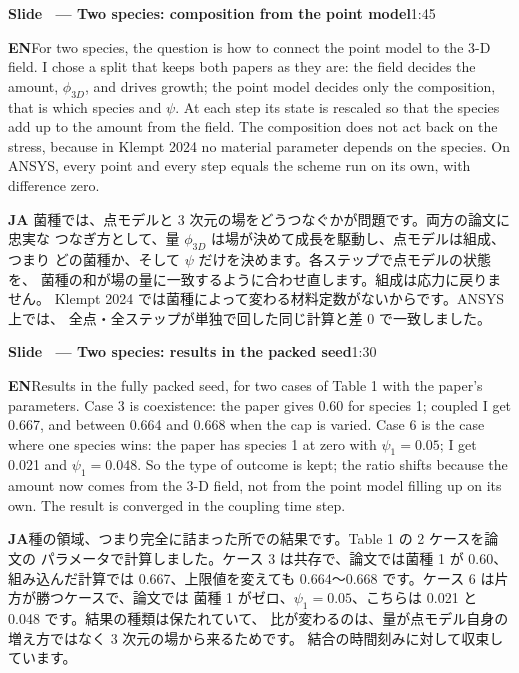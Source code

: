 \documentclass[11pt,a4paper]{article}
\newcounter{sl}
\newcommand{\slide}[2]{\stepcounter{sl}\vspace{8pt}%
  {\color{c3}\large\bfseries Slide \thesl\ --- #1}\hfill{\small #2}\par\vspace{2pt}}
\newcommand{\EN}{\textbf{EN}\quad}
\newcommand{\JA}{\par\textbf{JA}\quad}
\begin{document}
\slide{Two species: composition from the point model}{1:45}
\EN For two species, the question is how to connect the point model to the 3-D
field. I chose a split that keeps both papers as they are: the field decides the
amount, $\phi_{3D}$, and drives growth; the point model decides only the
composition, that is which species and $\psi$. At each step its state is rescaled
so that the species add up to the amount from the field. The composition does
not act back on the stress, because in Klempt 2024 no material parameter
depends on the species. On ANSYS, every point and every step equals the scheme
run on its own, with difference zero.
\JA 2 菌種では、点モデルと 3 次元の場をどうつなぐかが問題です。両方の論文に忠実な
つなぎ方として、量 $\phi_{3D}$ は場が決めて成長を駆動し、点モデルは組成、つまり
どの菌種か、そして $\psi$ だけを決めます。各ステップで点モデルの状態を、
菌種の和が場の量に一致するように合わせ直します。組成は応力に戻りません。
Klempt 2024 では菌種によって変わる材料定数がないからです。ANSYS 上では、
全点・全ステップが単独で回した同じ計算と差 0 で一致しました。

\slide{Two species: results in the packed seed}{1:30}
\EN Results in the fully packed seed, for two cases of Table 1 with the paper's
parameters. Case 3 is coexistence: the paper gives 0.60 for species 1; coupled
I get 0.667, and between 0.664 and 0.668 when the cap is varied. Case 6 is
the case where one species wins: the paper has species 1 at zero with
$\psi_1=0.05$; I get 0.021 and $\psi_1=0.048$. So the type of outcome is
kept; the ratio shifts because the amount now comes from the 3-D field, not
from the point model filling up on its own. The result is converged in the
coupling time step.
\JA 種の領域、つまり完全に詰まった所での結果です。Table 1 の 2 ケースを論文の
パラメータで計算しました。ケース 3 は共存で、論文では菌種 1 が 0.60、組み込んだ計算では
0.667、上限値を変えても 0.664〜0.668 です。ケース 6 は片方が勝つケースで、論文では
菌種 1 がゼロ、$\psi_1=0.05$、こちらは 0.021 と 0.048 です。結果の種類は保たれていて、
比が変わるのは、量が点モデル自身の増え方ではなく 3 次元の場から来るためです。
結合の時間刻みに対して収束しています。
\end{document}
